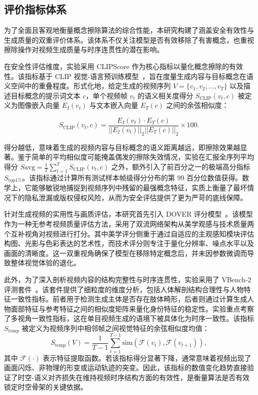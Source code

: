 \subsection{评价指标体系}

为了全面且客观地衡量概念擦除算法的综合性能，本研究构建了涵盖安全有效性与生成质量的双重评价体系。该体系不仅关注模型是否有效移除了有害概念，也重视擦除操作对视频生成质量与时序连贯性的潜在影响。

在安全性评估维度，实验采用 CLIPScore 作为核心指标以量化概念擦除的有效性。该指标基于 CLIP 视觉-语言预训练模型~\cite{Radford2021LearningTV}，旨在度量生成内容与目标概念在语义空间中的重叠程度。形式化地，给定生成的视频序列 $V = \{v_1, v_2, \dots, v_T\}$ 以及描述目标概念的提示词文本 $c$，单个视频帧 $v_t$ 的语义相关度得分 $S_{\text{CLIP}}(v_t, c)$ 被定义为图像嵌入向量 $E_I(v_t)$ 与文本嵌入向量 $E_T(c)$ 之间的余弦相似度：

\begin{equation}
    S_{\text{CLIP}}(v_t, c) = \frac{E_I(v_t) \cdot E_T(c)}{||E_I(v_t)||_2 ||E_T(c)||_2} \times 100.
\end{equation}

得分越低，意味着生成的视频内容与目标概念的语义距离越远，即擦除效果越显著。鉴于简单的平均相似度可能掩盖偶发的擦除失效情况，实验在汇报全序列平均得分 $S{\text{avg}} = \frac{1}{T}\sum_{t=1}^{T} S_{\text{CLIP}}(v_t, c)$ 之外，额外引入了前百分之一的极端高分指标 $S_{\text{top1\%}}$。该指标通过计算所有测试样本帧级得分分布的第 99 百分位数值获得。数学上，它能够敏锐地捕捉到视频序列中残留的最强概念特征，实质上衡量了最坏情况下的隐私泄漏或版权侵权风险，从而为安全评估提供了更为严苛的底线保障。

针对生成视频的实用性与画质评估，本研究首先引入 DOVER 评分模型~\cite{wu2023dover}。该模型作为一种无参考视频质量评估方法，采用了双流网络架构从美学观感与技术质量两个互补视角对视频进行打分。其中美学评分侧重于通过自适应的主观感知模块评估构图、光影与色彩表达的艺术性，而技术评分则专注于量化分辨率、噪点水平以及画面的清晰度。这一双重视角确保了模型在移除特定概念后，并未因参数微调而导致整体视觉体验的退化。

此外，为了深入剖析视频内容的结构完整性与时序连贯性，实验采用了 VBench-2 评测套件~\cite{huang2023vbench,zheng2025vbench2,huang2025vbench++}。该套件提供了细粒度的维度分析，包括人体解剖结构合理性与人物特征一致性指标。前者用于检测生成主体是否存在肢体畸形，后者则通过计算生成人物面部特征与参考特征之间的相似度矩阵来量化身份特征的稳定性。实验重点考察了多视角一致性指标，这在单目视频生成的语境下被具体化为时序一致性。该指标 $S_{\text{temp}}$ 被定义为视频序列中相邻帧之间视觉特征的余弦相似度均值：
\begin{equation}
S_{\text{temp}}(V) = \frac{1}{T-1} \sum_{t=1}^{T-1} \text{sim}\left( \mathcal{F}(v_t), \mathcal{F}(v_{t+1}) \right),
\end{equation}
其中 $\mathcal{F}(\cdot)$ 表示特征提取函数。若该指标得分显著下降，通常意味着视频出现了画面闪烁、非物理的形变或运动轨迹的突变。因此，该指标的数值变化趋势直接验证了时空-语义对齐损失在维持视频时序结构方面的有效性，是衡量算法是否有效锁定时空骨架的关键依据。


